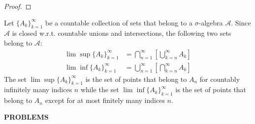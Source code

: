 \begin{flushleft}
\begin{proof}
	\end{proof}
	Let $\{A_k\}_{k=1}^\infty$ be a countable collection of sets that belong to a $\sigma$-algebra $\mathcal{A}$. Since $\mathcal{A}$ is closed w.r.t. countable unions and intersections, the following two sets belong to $\mathcal{A}$:
	\begin{align*}
		\lim\sup\{A_k\}_{k=1}^\infty&=\bigcap_{n=1}^\infty[\bigcup_{k=n}^\infty A_k]\\
		\lim\inf\{A_k\}_{k=1}^\infty&=\bigcup_{n=1}^\infty[\bigcap_{k=n}^\infty A_k]
	\end{align*}
	The set $\lim\sup\{A_k\}_{k=1}^\infty$ is the set of points that belong to $A_n$ for countably infinitely many indices $n$ while the set $\lim\inf\{A_k\}_{k=1}^\infty$ is the set of points that belong to $A_n$ except for at most finitely many indices $n$.
\end{flushleft}
\begin{center}
	\textbf{PROBLEMS}
\end{center}
